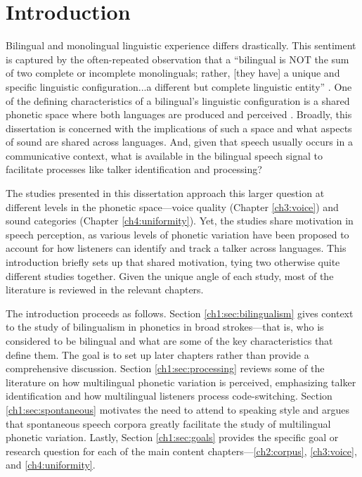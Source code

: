 
\chapter{Introduction}\label{ch:Introduction}

Bilingual and monolingual linguistic experience differs drastically. This sentiment is captured by the often-repeated observation that a ``bilingual is NOT the sum of two complete or incomplete monolinguals; rather, [they have] a unique and specific linguistic configuration...a different but complete linguistic entity'' \citep[][p. 6]{grosjean_1989_bilingual}. One of the defining characteristics of a bilingual's linguistic configuration is a shared phonetic space where both languages are produced and perceived \citep{flege_2021_slmr}. Broadly, this dissertation is concerned with the implications of such a space and what aspects of sound are shared across languages. And, given that speech usually occurs in a communicative context, what is available in the bilingual speech signal to facilitate processes like talker identification and processing? 

The studies presented in this dissertation approach this larger question at different levels in the phonetic space---voice quality (Chapter \ref{ch3:voice}) and sound categories (Chapter \ref{ch4:uniformity}). Yet, the studies share motivation in speech perception, as various levels of phonetic variation have been proposed to account for how listeners can identify and track a talker across languages. This introduction briefly sets up that shared motivation, tying two otherwise quite different studies together. Given the unique angle of each study, most of the literature is reviewed in the relevant chapters. 

The introduction proceeds as follows. Section \ref{ch1:sec:bilingualism} gives context to the study of bilingualism in phonetics in broad strokes---that is, who is considered to be bilingual and what are some of the key characteristics that define them. The goal is to set up later chapters rather than provide a comprehensive discussion. Section \ref{ch1:sec:processing} reviews some of the literature on how multilingual phonetic variation is perceived, emphasizing talker identification and how multilingual listeners process code-switching. Section \ref{ch1:sec:spontaneous} motivates the need to attend to speaking style and argues that spontaneous speech corpora greatly facilitate the study of multilingual phonetic variation. Lastly, Section \ref{ch1:sec:goals} provides the specific goal or research question for each of the main content chapters---\ref{ch2:corpus}, \ref{ch3:voice}, and \ref{ch4:uniformity}.

